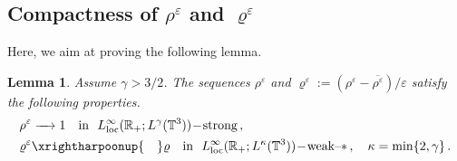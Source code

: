 \documentclass[11pt,reqno]{amsart}
\newtheorem{lemma}{Lemma}
\def \R{{\mathbb{R}}}
\def \T{{\mathbb{T}}}
\begin{document}
\subsection{Compactness of $\rho^\varepsilon $ and  $\varrho^\varepsilon $ }
Here, we aim at proving the following lemma.
\begin{lemma}
  \label{lem:cv-rho} Assume $ \gamma>3/2$. The sequences ${\rho^\varepsilon}$ and  $\varrho^\varepsilon:=(\rho^\varepsilon -\overline{\rho^\varepsilon})/\varepsilon$  satisfy the following properties.
  \begin{align*}
    & \rho^\varepsilon \xrightarrow{\quad} 1 \ \ \mbox{ \rm in } \  L_{\rm loc}^\infty(\R_+; L^\gamma(\T^3))\!-\!\mbox{\rm strong}\,,  \\
    & \varrho^\varepsilon \xrightharpoonup{\quad} \varrho\ \  \mbox{ \rm in } \  L_{\rm loc}^\infty(\R_+; L^\kappa(\T^3))\!-\!\mbox{\rm weak--}\ast\,, \quad \kappa=\min\{2,\gamma\}\,.
  \end{align*}
\end{lemma}
\end{document}
